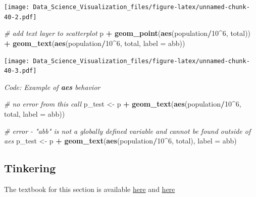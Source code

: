 \documentclass[
]{article}
\newenvironment{Shaded}{\begin{snugshade}}{\end{snugshade}}
\newcommand{\CommentTok}[1]{\textcolor[rgb]{0.56,0.35,0.01}{\textit{#1}}}
\newcommand{\DataTypeTok}[1]{\textcolor[rgb]{0.13,0.29,0.53}{#1}}
\newcommand{\DecValTok}[1]{\textcolor[rgb]{0.00,0.00,0.81}{#1}}
\newcommand{\KeywordTok}[1]{\textcolor[rgb]{0.13,0.29,0.53}{\textbf{#1}}}
\newcommand{\NormalTok}[1]{#1}
\newcommand{\OperatorTok}[1]{\textcolor[rgb]{0.81,0.36,0.00}{\textbf{#1}}}
\newcommand{\StringTok}[1]{\textcolor[rgb]{0.31,0.60,0.02}{#1}}
\begin{document}
\texttt{[image: Data\_Science\_Visualization\_files/figure-latex/unnamed-chunk-40-2.pdf]}

\begin{Shaded}
\begin{Highlighting}[]
\CommentTok{# add text layer to scatterplot}
\NormalTok{p }\OperatorTok{+}\StringTok{ }\KeywordTok{geom_point}\NormalTok{(}\KeywordTok{aes}\NormalTok{(population}\OperatorTok{/}\DecValTok{10}\OperatorTok{^}\DecValTok{6}\NormalTok{, total)) }\OperatorTok{+}
\StringTok{    }\KeywordTok{geom_text}\NormalTok{(}\KeywordTok{aes}\NormalTok{(population}\OperatorTok{/}\DecValTok{10}\OperatorTok{^}\DecValTok{6}\NormalTok{, total, }\DataTypeTok{label =}\NormalTok{ abb))}
\end{Highlighting}
\end{Shaded}

\texttt{[image: Data\_Science\_Visualization\_files/figure-latex/unnamed-chunk-40-3.pdf]}

\emph{Code: Example of \textbf{aes} behavior}

\begin{Shaded}
\begin{Highlighting}[]
\CommentTok{# no error from this call}
\NormalTok{p_test <-}\StringTok{ }\NormalTok{p }\OperatorTok{+}\StringTok{ }\KeywordTok{geom_text}\NormalTok{(}\KeywordTok{aes}\NormalTok{(population}\OperatorTok{/}\DecValTok{10}\OperatorTok{^}\DecValTok{6}\NormalTok{, total, }\DataTypeTok{label =}\NormalTok{ abb))}
\end{Highlighting}
\end{Shaded}

\begin{Shaded}
\begin{Highlighting}[]
\CommentTok{# error - "abb" is not a globally defined variable and cannot be found outside of aes}
\NormalTok{p_test <-}\StringTok{ }\NormalTok{p }\OperatorTok{+}\StringTok{ }\KeywordTok{geom_text}\NormalTok{(}\KeywordTok{aes}\NormalTok{(population}\OperatorTok{/}\DecValTok{10}\OperatorTok{^}\DecValTok{6}\NormalTok{, total), }\DataTypeTok{label =}\NormalTok{ abb)}
\end{Highlighting}
\end{Shaded}

\hypertarget{tinkering}{%
\subsection{Tinkering}\label{tinkering}}

The textbook for this section is available
\href{https://rafalab.github.io/dsbook/ggplot2.html\#tinkering-with-arguments}{here}
and
\href{https://rafalab.github.io/dsbook/ggplot2.html\#global-versus-local-aesthetic-mappings}{here}
\end{document}
